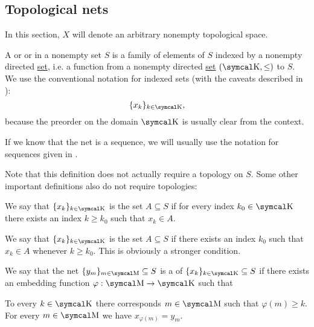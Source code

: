 \subsection{Topological nets}\label{subsec:topological_nets}

In this section, \( X \) will denote an arbitrary nonempty topological space.

\begin{Definition}\label{def:topological_net}
  A  or  or  in a nonempty set \( S \) is a family of elements of \( S \) indexed by a nonempty directed \hyperref[def:indexed_family]{set}, i.e. a function from a nonempty directed \hyperref[def:directed_set]{set} \( (\CK, \leq) \) to \( S \). We use the conventional notation for indexed sets (with the caveats described in ):
  \begin{equation*}
    \{ x_k \}_{k \in \CK},
  \end{equation*}
  because the preorder on the domain \( \CK \) is usually clear from the context.

  If we know that the net is a sequence, we will usually use the notation for sequences given in .

  Note that this definition does not actually require a topology on \( S \). Some other important definitions also do not require topologies:
  \begin{DefEnum}
     We say that \( \{ x_k \}_{k \in \CK} \) is  the set \( A \subseteq S \) if for every index \( k_0 \in \CK \) there exists an index \( k \geq k_0 \) such that \( x_k \in A \).

     We say that \( \{ x_k \}_{k \in \CK} \) is  the set \( A \subseteq S \) if there exists an index \( k_0 \) such that \( x_k \in A \) whenever \( k \geq k_0 \). This is obviously a stronger condition.

    \cite[50]{Engelking1989} We say that the net \( \{ y_m \}_{m \in \CM} \subseteq S \) is a  of \( \{ x_k \}_{k \in \CK} \subseteq S \) if there exists an embedding function \( \varphi: \CM \to \CK \) such that
    \begin{DefEnum}
       To every \( k \in \CK \) there corresponds \( m \in \CM \) such that \( \varphi(m) \geq k \).
       For every \( m \in \CM \) we have \( x_{\varphi(m)} = y_m \).
    \end{DefEnum}
  \end{DefEnum}
\end{Definition}

